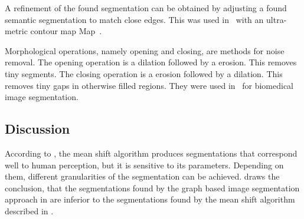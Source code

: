 A refinement of the found segmentation can be obtained by adjusting a found
semantic segmentation to match close edges. This was used
in~\cite{brox2011object} with an ultra-metric contour map
Map~\cite{arbelaez2009contours}.

Morphological operations, namely opening and closing, are methods for noise
removal. The opening operation is a dilation followed by a erosion. This
removes tiny segments. The closing operation is a erosion followed by a
dilation. This removes tiny gaps in otherwise filled regions. They were used
in~\cite{chen1998image} for biomedical image segmentation.


\subsection{Discussion}\label{subsec:traditional-approaches-discussion}%
According to \cite{pantofaru2005comparison}, the mean shift algorithm produces
segmentations that correspond well to human perception, but it is sensitive to
its parameters. Depending on them, different granularities of the segmentation
can be achieved. \cite{pantofaru2005comparison} draws the conclusion, that
the segmentations found by the graph based image segmentation approach
in \cite{felzenszwalb2004efficient} are inferior to the segmentations found
by the mean shift algorithm described in \cite{comaniciu2002mean}.
